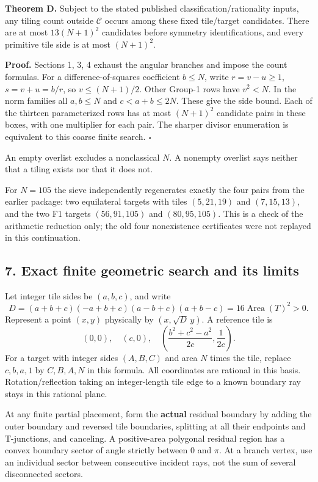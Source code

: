 \documentclass[
  11pt,
]{article}
\begin{document}
\textbf{Theorem D.} Subject to the stated published
classification/rationality inputs, any tiling count outside
\(\mathcal C\) occurs among these fixed tile/target candidates. There
are at most \(13(N+1)^2\) candidates before symmetry identifications,
and every primitive tile side is at most \((N+1)^2\).

\textbf{Proof.} Sections 1, 3, 4 exhaust the angular branches and impose
the count formulas. For a difference-of-squares coefficient \(b\le N\),
write \(r=v-u\ge1\), \(s=v+u=b/r\), so \(v\le(N+1)/2\). Other Group-1
rows have \(v^2<N\). In the norm families all \(a,b\le N\) and
\(c<a+b\le2N\). These give the side bound. Each of the thirteen
parameterized rows has at most \((N+1)^2\) candidate pairs in these
boxes, with one multiplier for each pair. The sharper divisor
enumeration is equivalent to this coarse finite search. \(\square\)

An empty overlist excludes a nonclassical \(N\). A nonempty overlist
says neither that a tiling exists nor that it does not.

For \(N=105\) the sieve independently regenerates exactly the four pairs
from the earlier package: two equilateral targets with tiles
\((5,21,19)\) and \((7,15,13)\), and the two F1 targets \((56,91,105)\)
and \((80,95,105)\). This is a check of the arithmetic reduction only;
the old four nonexistence certificates were not replayed in this
continuation.

\subsection{7. Exact finite geometric search and its
limits}\label{exact-finite-geometric-search-and-its-limits}

Let integer tile sides be \((a,b,c)\), and write
\[D=(a+b+c)(-a+b+c)(a-b+c)(a+b-c)=16\operatorname{Area}(T)^2>0.\]
Represent a point \((x,y)\) physically by \((x,\sqrt D\,y)\). A
reference tile is \[\left(0,0\right),\quad(c,0),\quad
\left(\frac{b^2+c^2-a^2}{2c},\frac1{2c}\right).\] For a target with
integer sides \((A,B,C)\) and area \(N\) times the tile, replace
\(c,b,a,1\) by \(C,B,A,N\) in this formula. All coordinates are rational
in this basis. Rotation/reflection taking an integer-length tile edge to
a known boundary ray stays in this rational plane.

At any finite partial placement, form the \textbf{actual} residual
boundary by adding the outer boundary and reversed tile boundaries,
splitting at all their endpoints and T-junctions, and canceling. A
positive-area polygonal residual region has a convex boundary sector of
angle strictly between \(0\) and \(\pi\). At a branch vertex, use an
individual sector between consecutive incident rays, not the sum of
several disconnected sectors.
\end{document}
